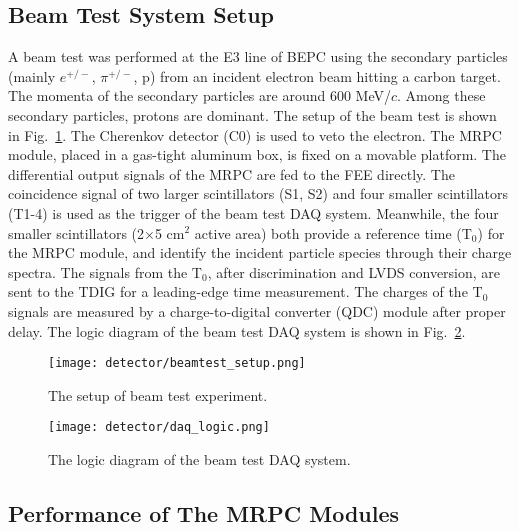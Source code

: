 \subsection{Beam Test System Setup}
A beam test was performed at the E3 line of BEPC\uppercase\expandafter{} using the secondary particles (mainly $e^{+/-}$, $\pi^{+/-}$, p) from an incident electron beam hitting a carbon target. The momenta of the secondary particles are around 600 MeV/$c$. Among these secondary particles, protons are dominant. The setup of the beam test is shown in Fig.~\ref{beamtestSetup}. The Cherenkov detector (C0) is used to veto the electron. The MRPC module, placed in a gas-tight aluminum box, is fixed on a movable platform. The differential output signals of the MRPC are fed to the FEE directly. The coincidence signal of two larger scintillators (S1, S2) and four smaller scintillators (T1-4) is used as the trigger of the beam test DAQ system. Meanwhile, the four smaller scintillators (2$\times$5 cm$^{2}$ active area) both provide a reference time (T$_{0}$) for the MRPC module, and identify the incident particle species through their charge spectra. The signals from the T$_{0}$, after discrimination and LVDS conversion, are sent to the TDIG for a leading-edge time measurement. The charges of the T$_{0}$ signals are measured by a charge-to-digital converter (QDC) module after proper delay. The logic diagram of the beam test DAQ system is shown in Fig.~\ref{daqSys}.

\begin{figure}[htbp]
\begin{center}
\texttt{[image: detector/beamtest\_setup.png]}
\vspace*{-3mm}
\caption{The setup of beam test experiment.} \label{beamtestSetup}
\end{center}
\end{figure}

\begin{figure}[htbp]
\begin{center}
\texttt{[image: detector/daq\_logic.png]}
\vspace*{-3mm}
\caption{The logic diagram of the beam test DAQ system.} \label{daqSys}
\end{center}
\end{figure}

\subsection{Performance of The MRPC Modules}


